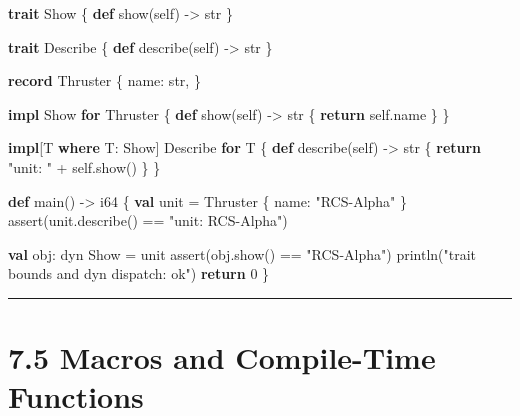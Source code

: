 \documentclass[
  english,
  oneside]{book}
\newenvironment{Shaded}{\begin{snugshade}}{\end{snugshade}}
\newcommand{\ConstantTok}[1]{\textcolor[rgb]{0.31,0.76,1.00}{#1}}
\newcommand{\ControlFlowTok}[1]{\textcolor[rgb]{0.77,0.53,0.75}{\textbf{#1}}}
\newcommand{\DataTypeTok}[1]{\textcolor[rgb]{0.31,0.79,0.69}{#1}}
\newcommand{\DecValTok}[1]{\textcolor[rgb]{0.71,0.81,0.66}{#1}}
\newcommand{\FunctionTok}[1]{\textcolor[rgb]{0.86,0.86,0.67}{#1}}
\newcommand{\KeywordTok}[1]{\textcolor[rgb]{0.34,0.61,0.84}{\textbf{#1}}}
\newcommand{\NormalTok}[1]{\textcolor[rgb]{0.83,0.83,0.83}{#1}}
\newcommand{\OperatorTok}[1]{\textcolor[rgb]{0.83,0.83,0.83}{#1}}
\newcommand{\StringTok}[1]{\textcolor[rgb]{0.81,0.57,0.47}{#1}}
\begin{document}
\begin{Shaded}
\begin{Highlighting}[]
\KeywordTok{trait}\NormalTok{ Show \{}
    \KeywordTok{def}\NormalTok{ show(self) }\OperatorTok{{-}\textgreater{}} \DataTypeTok{str}
\NormalTok{\}}

\KeywordTok{trait}\NormalTok{ Describe \{}
    \KeywordTok{def}\NormalTok{ describe(self) }\OperatorTok{{-}\textgreater{}} \DataTypeTok{str}
\NormalTok{\}}

\KeywordTok{record}\NormalTok{ Thruster \{}
\NormalTok{    name: }\DataTypeTok{str}\NormalTok{,}
\NormalTok{\}}

\KeywordTok{impl}\NormalTok{ Show }\ControlFlowTok{for}\NormalTok{ Thruster \{}
    \KeywordTok{def}\NormalTok{ show(self) }\OperatorTok{{-}\textgreater{}} \DataTypeTok{str}\NormalTok{ \{}
        \ControlFlowTok{return}\NormalTok{ self}\OperatorTok{.}\NormalTok{name}
\NormalTok{    \}}
\NormalTok{\}}

\KeywordTok{impl}\NormalTok{[T }\KeywordTok{where}\NormalTok{ T: Show] Describe }\ControlFlowTok{for}\NormalTok{ T \{}
    \KeywordTok{def}\NormalTok{ describe(self) }\OperatorTok{{-}\textgreater{}} \DataTypeTok{str}\NormalTok{ \{}
        \ControlFlowTok{return} \StringTok{"unit: "} \OperatorTok{+}\NormalTok{ self}\OperatorTok{.}\NormalTok{show()}
\NormalTok{    \}}
\NormalTok{\}}

\KeywordTok{def}\NormalTok{ main() }\OperatorTok{{-}\textgreater{}} \DataTypeTok{i64}\NormalTok{ \{}
    \KeywordTok{val} \ConstantTok{unit} \OperatorTok{=}\NormalTok{ Thruster \{ name: }\StringTok{"RCS{-}Alpha"}\NormalTok{ \}}
    \FunctionTok{assert}\NormalTok{(}\ConstantTok{unit}\OperatorTok{.}\NormalTok{describe() }\OperatorTok{==} \StringTok{"unit: RCS{-}Alpha"}\NormalTok{)}

    \KeywordTok{val}\NormalTok{ obj: dyn Show }\OperatorTok{=} \ConstantTok{unit}
    \FunctionTok{assert}\NormalTok{(obj}\OperatorTok{.}\NormalTok{show() }\OperatorTok{==} \StringTok{"RCS{-}Alpha"}\NormalTok{)}
\NormalTok{    println(}\StringTok{"trait bounds and dyn dispatch: ok"}\NormalTok{)}
    \ControlFlowTok{return} \DecValTok{0}
\NormalTok{\}}
\end{Highlighting}
\end{Shaded}

\begin{center}\rule{0.5\linewidth}{0.5pt}\end{center}

\section{7.5 Macros and Compile-Time
Functions}\label{macros-and-compile-time-functions}
\end{document}
